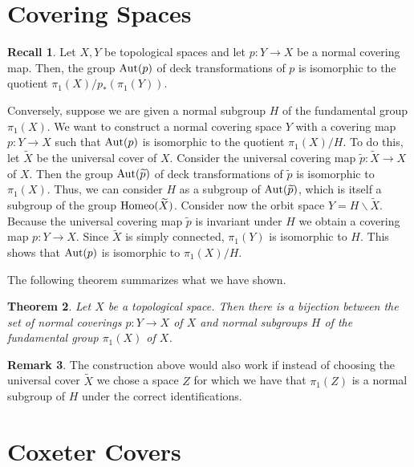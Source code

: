 \documentclass{article}
\newtheorem{theorem}{Theorem}[section]
\theoremstyle{definition}
\newtheorem{recall}[theorem]{Recall}
\newtheorem{remark}[theorem]{Remark}
\newcommand{\Aut}{\textup{Aut}}
\newcommand{\Homeo}{\textup{Homeo}}
\begin{document}
\section{Covering Spaces}
\begin{recall}
Let $X, Y$ be topological spaces and let $p: Y \rightarrow X$ be a normal covering map. Then, the group $\Aut(p)$ of deck transformations of $p$ is isomorphic to the quotient $\pi_1(X) / p_*(\pi_1(Y))$.

Conversely, suppose we are given a normal subgroup $H$ of the fundamental group $\pi_1(X)$. 
We want to construct a normal covering space $Y$ with a covering map $p: Y \rightarrow X$ such that $\Aut(p)$ is isomorphic to the quotient $\pi_1(X) / H$. 
To do this, let $\widetilde{X}$ be the universal cover of $X$. 
Consider the universal covering map $\widetilde{p}: \widetilde{X} \rightarrow X$ of $X$. 
Then the group $\Aut(\widetilde{p})$ of deck transformations of $\widetilde{p}$ is isomorphic to $\pi_1(X)$. 
Thus, we can consider $H$ as a subgroup of $\Aut(\widetilde{p})$, which is itself a subgroup of the group $\Homeo(\widetilde{X})$.
Consider now the orbit space $Y = H \backslash \widetilde{X}$. 
Because the universal covering map $\widetilde{p}$ is invariant under $H$ we obtain a covering map $p: Y \rightarrow X$. Since $\widetilde{X}$ is simply connected, $\pi_1(Y)$ is isomorphic to $H$. This shows that $\Aut(p)$ is isomorphic to $\pi_1(X)/H$.

The following theorem summarizes what we have shown.
\end{recall}

\begin{theorem}
Let $X$ be a topological space. Then there is a bijection between the set of normal coverings $p: Y \rightarrow X$ of $X$ and normal subgroups $H$ of the fundamental group $\pi_1(X)$ of $X$.
\end{theorem}

\begin{remark}
The construction above would also work if instead of choosing the universal cover $\widetilde{X}$ we chose a space $Z$ for which we have that $\pi_1(Z)$ is a normal subgroup of $H$ under the correct identifications.
\end{remark}

\section{Coxeter Covers}
\end{document}
